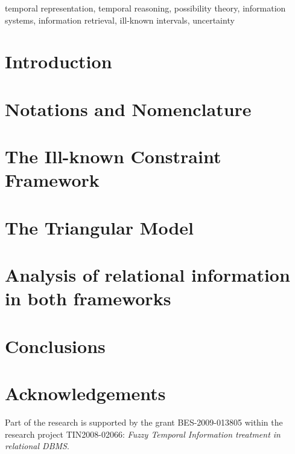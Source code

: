 \documentclass[twocolumn,a4paper]{article}
\theoremstyle{definition}
\begin{document}
\begin{keywords}
temporal representation, temporal reasoning, possibility theory, information systems, information retrieval, ill-known intervals, uncertainty
\end{keywords}

\section{\label{sec:introduction}Introduction}


\section{\label{sec:general-preliminaries}Notations and Nomenclature}


\section{\label{sec:ikc}The Ill-known Constraint Framework}


\section{\label{sec:tm}The Triangular Model}


\section{\label{sec:proposal}Analysis of relational information in both frameworks}


\section{\label{sec:conclusions}Conclusions}


\section*{Acknowledgements}
Part of the research is supported by the grant BES-2009-013805 within the research project TIN2008-02066: \emph{Fuzzy Temporal Information treatment in relational DBMS}.
\end{document}
